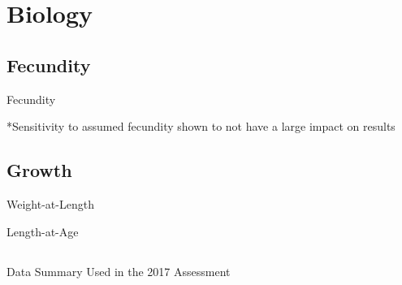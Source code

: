 \documentclass[pdf]{beamer}\usepackage[]{graphicx}\usepackage[]{color}
\begin{document}
\section{Biology}


\subsection{Fecundity}
\begin{frame}{Fecundity}
  \begin{center}
  \end{center}
  *Sensitivity to assumed fecundity shown to not have a large impact on results
\end{frame}

\subsection{Growth}
\begin{frame}{Weight-at-Length}
  \begin{center}
  \end{center}
\end{frame}

\begin{frame}{Length-at-Age}
  \begin{center}
  \end{center}
\end{frame}



\subsection{}
\begin{frame}{Data Summary Used in the 2017 Assessment}
  \begin{figure}[ht]
    \begin{center}

    \end{center}
  \end{figure}
\end{frame}
\end{document}
